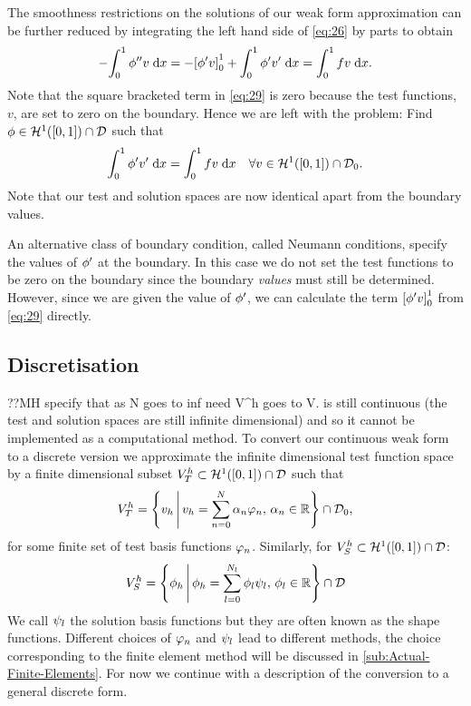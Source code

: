 {The smoothness restrictions on the solutions of our weak form approximation can be further reduced by integrating the left hand side of \cref{eq:26} by parts to obtain
\begin{equation}
  -{\int_0^1  \phi''v  {\; \mathrm{{d}}}{x}} = -{\left[ \phi' v \right]}_{0}^{1} + {\int_0^1  \phi'v'  {\; \mathrm{{d}}}{x}} = {\int_0^1 f v {\; \mathrm{{d}}}{x}}.
  \label{eq:29}
\end{equation}
Note that the square bracketed term in \cref{eq:29} is zero because the test functions, $v$, are set to zero on the boundary.
Hence we are left with the problem: Find $\phi \in \mathcal{H}^1([0,1]) \cap \mathcal{D}$ such that
\begin{equation}
  {\int_0^1  \phi'v'  {\; \mathrm{{d}}}{x}} = {\int_0^1  fv  {\; \mathrm{{d}}}{x}} \quad \forall v \in \mathcal{H}^1([0,1]) \cap \mathcal{D}_0.
  \label{eq:symmetric-weak-poisson}
\end{equation}
Note that our test and solution spaces are now identical apart from the boundary values.

An alternative class of boundary condition, called Neumann conditions, specify the values of $\phi'$ at the boundary.
In this case we do not set the test functions to be zero on the boundary since the boundary \emph{values} must still be determined.
However, since we are given the value of $\phi'$, we can calculate the term ${\left[ \phi' v \right]}_{0}^{1}$ from \cref{eq:29} directly.

\subsection{Discretisation}

??MH specify that as N goes to inf need V^h goes to V.
 is still continuous (\ie the test and solution spaces are still infinite dimensional) and so it cannot be implemented as a computational method.
To convert our continuous weak form to a discrete version we approximate the infinite dimensional test function space by a finite dimensional subset $V_{T}^{h} \subset \mathcal{H}^1([0,1]) \cap \mathcal{D}$ such that
\begin{equation}
  V_{T}^{h} = \left\{ {v_h } \,\middle|\, { v_h = \sum_{n=0}^{N}\alpha_{n} \varphi_{n},\, \alpha_{n} \in \mathbb{R}} \right\} \cap \mathcal{D}_0,
  \label{eq:30}
\end{equation}
for some finite set of test basis functions $\varphi_{n}$.
Similarly, for $V_S^h \subset \mathcal{H}^1([0,1]) \cap \mathcal{D}$:
\begin{equation}
  \label{eq:34}
  V_{S}^{h} = \left\{ {{\phi}_h } \,\middle|\, { {\phi}_h = \sum_{l=0}^{N_l}\phi_{l} \psi_{l},\, \phi_{l} \in \mathbb{R}} \right\}
  \cap \mathcal{D}
\end{equation}
We call $\psi_l$ the solution basis functions but they are often known as the shape functions.
Different choices of $\varphi_{n}$ and $\psi_l$ lead to different methods, the choice corresponding to the finite element method will be discussed in \cref{sub:Actual-Finite-Elements}.
For now we continue with a description of the conversion to a general discrete form.


}

